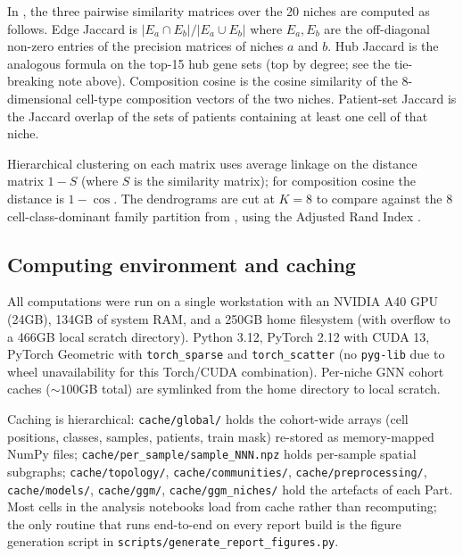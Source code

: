 In , the three pairwise similarity matrices over the 20 niches are computed as follows. Edge Jaccard is $|E_a \cap E_b| / |E_a \cup E_b|$ where $E_a, E_b$ are the off-diagonal non-zero entries of the precision matrices of niches $a$ and $b$. Hub Jaccard is the analogous formula on the top-15 hub gene sets (top by degree; see the tie-breaking note above). Composition cosine is the cosine similarity of the 8-dimensional cell-type composition vectors of the two niches. Patient-set Jaccard is the Jaccard overlap of the sets of patients containing at least one cell of that niche.

Hierarchical clustering on each matrix uses average linkage on the distance matrix $1 - S$ (where $S$ is the similarity matrix); for composition cosine the distance is $1 - \cos$. The dendrograms are cut at $K = 8$ to compare against the 8 cell-class-dominant family partition from , using the Adjusted Rand Index \cite{hubert1985ari}.

\subsection*{Computing environment and caching}

All computations were run on a single workstation with an NVIDIA A40 GPU (24GB), 134GB of system RAM, and a 250GB home filesystem (with overflow to a 466GB local scratch directory). Python 3.12, PyTorch 2.12 with CUDA 13, PyTorch Geometric with \texttt{torch\_sparse} and \texttt{torch\_scatter} (no \texttt{pyg-lib} due to wheel unavailability for this Torch/CUDA combination). Per-niche GNN cohort caches ($\sim 100$GB total) are symlinked from the home directory to local scratch.

Caching is hierarchical: \texttt{cache/global/} holds the cohort-wide arrays (cell positions, classes, samples, patients, train mask) re-stored as memory-mapped NumPy files; \texttt{cache/per\_sample/sample\_NNN.npz} holds per-sample spatial subgraphs; \texttt{cache/topology/}, \texttt{cache/communities/}, \texttt{cache/preprocessing/}, \texttt{cache/models/}, \texttt{cache/ggm/}, \texttt{cache/ggm\_niches/} hold the artefacts of each Part. Most cells in the analysis notebooks load from cache rather than recomputing; the only routine that runs end-to-end on every report build is the figure generation script in \texttt{scripts/generate\_report\_figures.py}.